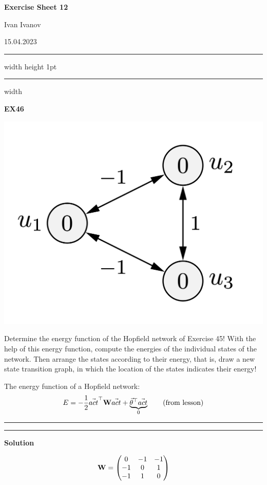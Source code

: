 \documentclass[a4paper,12pt]{article} %
\begin{document}
    \textbf{\large Exercise Sheet 12}\par\smallskip
    \begin{minipage}{.45\textwidth}
        Ivan Ivanov
    \end{minipage}
    \hfill
    15.04.2023\par\smallskip

    \medskip
    \hrule width \textwidth height 1pt
    \vskip 1pt \hrule width \textwidth
    \par\bigskip

    \begin{center}
        \large\textbf{EX46}
    \end{center}

    \begin{floatingfigure}{.3\textwidth}
        \noindent
        \vskip -4mm
        \hfil
        \includegraphics[width=.2\textwidth]{im1.png}
        \hfil
    \end{floatingfigure}
    Determine the energy function of the Hopfield network of Exercise 45! With the help of this energy function, compute the energies of the individual states of the network. Then arrange the states according to their energy, that is, draw a new state transition graph, in which the location of the states indicates their energy!\par\medskip
    The energy function of a Hopfield network:
    \[
        E=-\frac12\vec{act}^\top{\bf{W}} \vec{act}+\underbrace{\vec\theta^\top\vec{act}}_0 \qquad \text{(from lesson)}
    \]

    \bigskip
    \hrule width 3cm height 1pt
    \vskip 1pt \hrule width 3cm
    \medskip\par\smallskip

    \begin{center}  
        \large
        \textbf{Solution}
    \end{center}

    \[
        {\bf W}=
        \begin{pmatrix}
            0 & -1 & -1\\
            -1 & 0 & 1\\
            -1 & 1 & 0\\
        \end{pmatrix}
    \]\par
\end{document}
